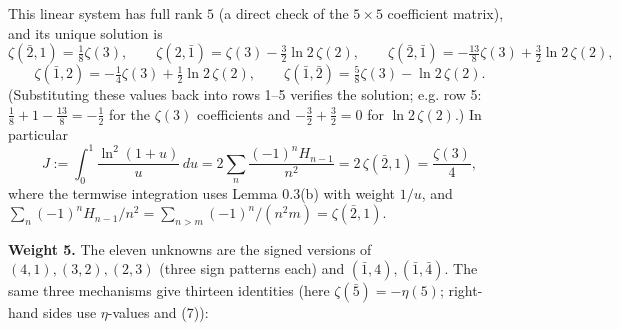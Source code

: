 \documentclass[11pt]{article}
\theoremstyle{remark}
\begin{document}
This linear system has full rank $5$ (a direct check of the $5\times5$ coefficient matrix), and its
unique solution is
\[
\zeta(\bar2,1)=\tfrac18\zeta(3),\qquad
\zeta(2,\bar1)=\zeta(3)-\tfrac32\ln2\,\zeta(2),\qquad
\zeta(\bar2,\bar1)=-\tfrac{13}{8}\zeta(3)+\tfrac32\ln2\,\zeta(2),
\]
\begin{equation}
\zeta(\bar1,2)=-\tfrac14\zeta(3)+\tfrac12\ln2\,\zeta(2),\qquad
\zeta(\bar1,\bar2)=\tfrac58\zeta(3)-\ln2\,\zeta(2). \tag{8}
\end{equation}
(Substituting these values back into rows 1--5 verifies the solution; e.g. row 5:
$\tfrac18+1-\tfrac{13}8=-\tfrac12$ for the $\zeta(3)$ coefficients and $-\tfrac32+\tfrac32=0$ for
$\ln2\,\zeta(2)$.) In particular
\begin{equation}
J:=\int_0^1\frac{\ln^2(1+u)}{u}\,du
=2\sum_{n}\frac{(-1)^nH_{n-1}}{n^2}=2\,\zeta(\bar2,1)=\frac{\zeta(3)}{4}, \tag{9}
\end{equation}
where the termwise integration uses Lemma 0.3(b) with weight $1/u$, and
$\sum_n(-1)^nH_{n-1}/n^2=\sum_{n>m}(-1)^n/(n^2m)=\zeta(\bar2,1)$.

\textbf{Weight 5.} The eleven unknowns are the signed versions of $(4,1),(3,2),(2,3)$ (three sign
patterns each) and $(\bar1,4),(\bar1,\bar4)$. The same three mechanisms give thirteen identities
(here $\zeta(\bar5)=-\eta(5)$; right-hand sides use $\eta$-values and (7)):
\end{document}
